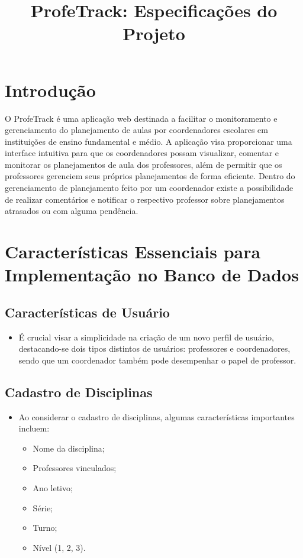 \documentclass{article}
\title{ProfeTrack: Especificações do Projeto}
\author{}
\date{}
\begin{document}
\maketitle

\section{Introdução}
O ProfeTrack é uma aplicação web destinada a facilitar o monitoramento e gerenciamento do planejamento de aulas por coordenadores escolares em instituições de ensino fundamental e médio. A aplicação visa proporcionar uma interface intuitiva para que os coordenadores possam visualizar, comentar e monitorar os planejamentos de aula dos professores, além de permitir que os professores gerenciem seus próprios planejamentos de forma eficiente. Dentro do gerenciamento de planejamento feito por um coordenador existe a possibilidade de realizar comentários e notificar o respectivo professor sobre planejamentos atrasados ou com alguma pendência.

\section{Características Essenciais para Implementação no Banco de Dados}

\subsection{Características de Usuário}
\begin{itemize}
    \item É crucial visar a simplicidade na criação de um novo perfil de usuário, destacando-se dois tipos distintos de usuários: professores e coordenadores, sendo que um coordenador também pode desempenhar o papel de professor.
\end{itemize}

\subsection{Cadastro de Disciplinas}
\begin{itemize}
    \item Ao considerar o cadastro de disciplinas, algumas características importantes incluem:
    \begin{itemize}
        \item Nome da disciplina;
        \item Professores vinculados;
        \item Ano letivo;
        \item Série;
        \item Turno;
        \item Nível (1, 2, 3).
    \end{itemize}
\end{itemize}
\end{document}
